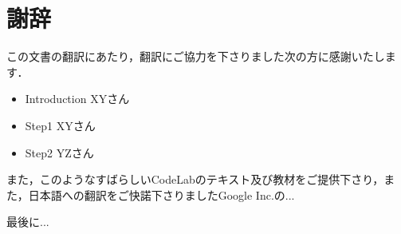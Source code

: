 \section*{謝辞}

この文書の翻訳にあたり，翻訳にご協力を下さりました次の方に感謝いたします．

\begin{itemize}
\item Introduction XYさん
\item Step1 XYさん
\item Step2 YZさん
\end{itemize}

また，このようなすばらしいCodeLabのテキスト及び教材をご提供下さり，また，日本語への翻訳をご快諾下さりましたGoogle Inc.の...

最後に...


